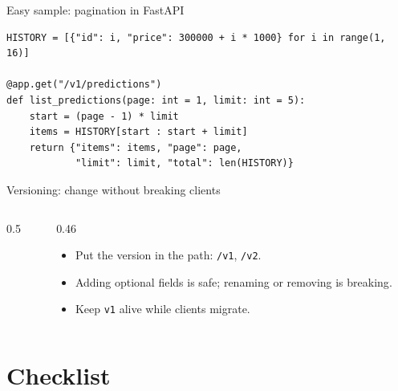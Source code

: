 \documentclass[aspectratio=169,10pt]{beamer}
\begin{document}
\begin{frame}[fragile]{Easy sample: pagination in FastAPI}
\begin{lstlisting}
HISTORY = [{"id": i, "price": 300000 + i * 1000} for i in range(1, 16)]

@app.get("/v1/predictions")
def list_predictions(page: int = 1, limit: int = 5):
    start = (page - 1) * limit
    items = HISTORY[start : start + limit]
    return {"items": items, "page": page,
            "limit": limit, "total": len(HISTORY)}
\end{lstlisting}
\end{frame}

\begin{frame}{Versioning: change without breaking clients}
\begin{columns}[T]
\begin{column}{0.5\textwidth}
\begin{center}
\end{center}
\end{column}
\begin{column}{0.46\textwidth}
\begin{itemize}
\item Put the version in the path: \texttt{/v1}, \texttt{/v2}.
\item Adding optional fields is safe; renaming or removing is \alert{breaking}.
\item Keep \texttt{v1} alive while clients migrate.
\end{itemize}
\end{column}
\end{columns}
\end{frame}

\section{Checklist}
\end{document}
